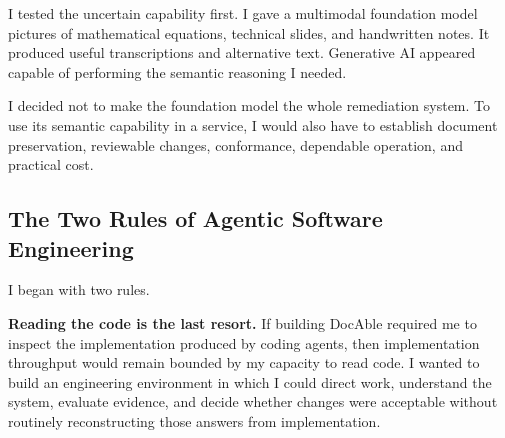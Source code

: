 
I tested the uncertain capability first. I gave a multimodal foundation model pictures of mathematical equations, technical slides, and handwritten notes. It produced useful transcriptions and alternative text. Generative AI appeared capable of performing the semantic reasoning I needed.


I decided not to make the foundation model the whole remediation system. To use its semantic capability in a service, I would also have to establish document preservation, reviewable changes, conformance, dependable operation, and practical cost.

\subsection{The Two Rules of Agentic Software Engineering}\label{heading:the-two-rules-of-agentic-software-engineering}


I began with two rules.

\textbf{Reading the code is the last resort.} If building DocAble required me to inspect the implementation produced by coding agents, then implementation throughput would remain bounded by my capacity to read code. I wanted to build an engineering environment in which I could direct work, understand the system, evaluate evidence, and decide whether changes were acceptable without routinely reconstructing those answers from implementation.

